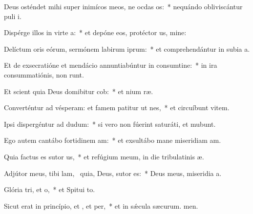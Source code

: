 \item Deus osténdet mihi super inimícos meos, ne ocdas os:~* nequándo obliviscántur puli i.
\item Dispérge illos in virte a:~* et depóne eos, protéctor us, mine:
\item Delíctum oris eórum, sermónem labirum iprum:~* et comprehendántur in subia a.
\item Et de exsecratióne et mendácio annuntiabúntur in consumtine:~* in ira consummatiónis,  non runt.
\item Et scient quia Deus domibitur cob:~* et nium ræ.
\item Converténtur ad vésperam: et famem patitur ut nes,~* et circuíbunt vitem.
\item Ipsi dispergéntur ad dudum:~* si vero non fúerint saturáti, et mubunt.
\item Ego autem cantábo fortidinem am:~* et exsultábo mane miseridiam am.
\item Quia factus es sutor us,~* et refúgium meum, in die tribulatinis æ.
\item Adjútor meus, tibi lam,~\pscross{} quia, Deus, sutor  es:~* Deus meus, miseridia a.
\item Glória tri, et o,~* et Spitui to.
\item Sicut erat in princípio, et , et per,~* et in sǽcula sæcurum. men.
